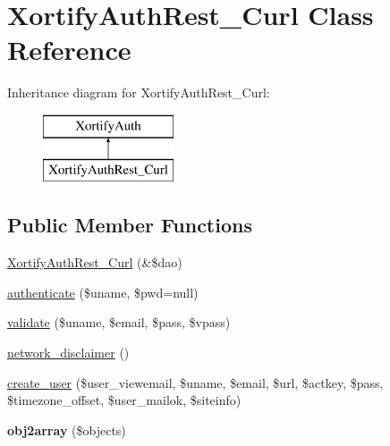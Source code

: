 \hypertarget{class_xortify_auth_rest___curl}{\section{Xortify\-Auth\-Rest\-\_\-\-Curl Class Reference}
\label{class_xortify_auth_rest___curl}
}
Inheritance diagram for Xortify\-Auth\-Rest\-\_\-\-Curl\-:\begin{figure}[H]
\begin{center}
\leavevmode
\includegraphics[height=2.000000cm]{class_xortify_auth_rest___curl}
\end{center}
\end{figure}
\subsection*{Public Member Functions}
\begin{DoxyCompactItemize}
\item 
\hyperlink{class_xortify_auth_rest___curl_aa76c432d8cd7d3ac38c9eeb9fc3684ce}{Xortify\-Auth\-Rest\-\_\-\-Curl} (\&\$dao)
\item 
\hyperlink{class_xortify_auth_rest___curl_a86b106500cf64c36b4b348eeebc575c7}{authenticate} (\$uname, \$pwd=null)
\item 
\hyperlink{class_xortify_auth_rest___curl_a6506980414441d93c54e2cf17456d6ee}{validate} (\$uname, \$email, \$pass, \$vpass)
\item 
\hyperlink{class_xortify_auth_rest___curl_a0c740fb7b1e7cd9c39b7b313a7154e42}{network\-\_\-disclaimer} ()
\item 
\hyperlink{class_xortify_auth_rest___curl_a1d2ccb67fe36e2396fb5abe290dad45e}{create\-\_\-user} (\$user\-\_\-viewemail, \$uname, \$email, \$url, \$actkey, \$pass, \$timezone\-\_\-offset, \$user\-\_\-mailok, \$siteinfo)
\item 
\hypertarget{class_xortify_auth_rest___curl_a97899a1eb9421f9ff3c237dc5cffc275}{{\bfseries obj2array} (\$objects)}\label{class_xortify_auth_rest___curl_a97899a1eb9421f9ff3c237dc5cffc275}

\end{DoxyCompactItemize}
